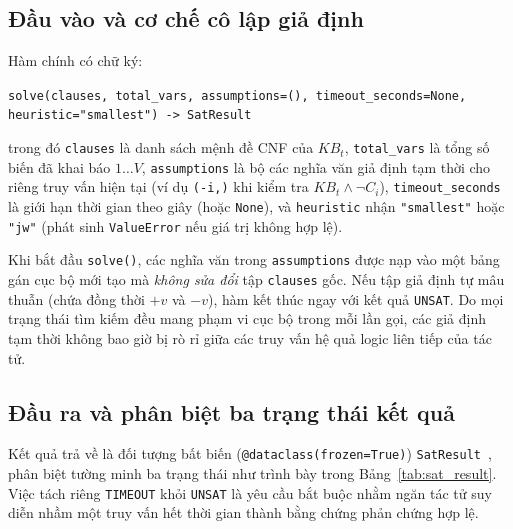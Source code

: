 \subsection{Đầu vào và cơ chế cô lập giả định}
Hàm chính có chữ ký:
\begin{center}
    \small\texttt{solve(clauses, total\_vars, assumptions=(), timeout\_seconds=None,}\\
    \small\texttt{heuristic="smallest") -> SatResult}
\end{center}
trong đó \texttt{clauses} là danh sách mệnh đề CNF của $KB_t$, \texttt{total\_vars} là tổng số biến đã khai báo $1 \dots V$, \texttt{assumptions} là bộ các nghĩa văn giả định tạm thời cho riêng truy vấn hiện tại (ví dụ \texttt{(-i,)} khi kiểm tra $KB_t \land \neg C_i$), \texttt{timeout\_seconds} là giới hạn thời gian theo giây (hoặc \texttt{None}), và \texttt{heuristic} nhận \texttt{"smallest"} hoặc \texttt{"jw"} (phát sinh \texttt{ValueError} nếu giá trị không hợp lệ).

Khi bắt đầu \texttt{solve()}, các nghĩa văn trong \texttt{assumptions} được nạp vào một bảng gán cục bộ mới tạo mà \textit{không sửa đổi} tập \texttt{clauses} gốc. Nếu tập giả định tự mâu thuẫn (chứa đồng thời $+v$ và $-v$), hàm kết thúc ngay với kết quả \texttt{UNSAT}. Do mọi trạng thái tìm kiếm đều mang phạm vi cục bộ trong mỗi lần gọi, các giả định tạm thời không bao giờ bị rò rỉ giữa các truy vấn hệ quả logic liên tiếp của tác tử.

\subsection{Đầu ra và phân biệt ba trạng thái kết quả}
Kết quả trả về là đối tượng bất biến (\texttt{@dataclass(frozen=True)}) \texttt{SatResult}~\cite{pythonDataclasses}, phân biệt tường minh ba trạng thái như trình bày trong Bảng~\ref{tab:sat_result}. Việc tách riêng \texttt{TIMEOUT} khỏi \texttt{UNSAT} là yêu cầu bắt buộc nhằm ngăn tác tử suy diễn nhầm một truy vấn hết thời gian thành bằng chứng phản chứng hợp lệ.

